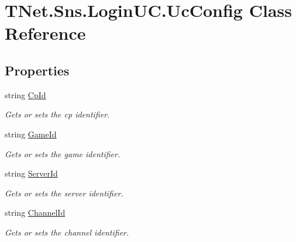 \hypertarget{class_t_net_1_1_sns_1_1_login_u_c_1_1_uc_config}{}\section{T\+Net.\+Sns.\+Login\+U\+C.\+Uc\+Config Class Reference}
\label{class_t_net_1_1_sns_1_1_login_u_c_1_1_uc_config}
\subsection*{Properties}
\begin{DoxyCompactItemize}
\item 
string \mbox{\hyperlink{class_t_net_1_1_sns_1_1_login_u_c_1_1_uc_config_ab589a724dd03664ddf2544fbae7ee120}{Cp\+Id}}
\begin{DoxyCompactList}\small\item\em Gets or sets the cp identifier. \end{DoxyCompactList}\item 
string \mbox{\hyperlink{class_t_net_1_1_sns_1_1_login_u_c_1_1_uc_config_a50509809147b3202a338fb7783fe204a}{Game\+Id}}
\begin{DoxyCompactList}\small\item\em Gets or sets the game identifier. \end{DoxyCompactList}\item 
string \mbox{\hyperlink{class_t_net_1_1_sns_1_1_login_u_c_1_1_uc_config_aed9d06559052ea1179f7078232213bf6}{Server\+Id}}
\begin{DoxyCompactList}\small\item\em Gets or sets the server identifier. \end{DoxyCompactList}\item 
string \mbox{\hyperlink{class_t_net_1_1_sns_1_1_login_u_c_1_1_uc_config_aaff5d58a35efbf9f9b54b9b210043ee8}{Channel\+Id}}
\begin{DoxyCompactList}\small\item\em Gets or sets the channel identifier. \end{DoxyCompactList}\item 

\end{DoxyCompactItemize}
